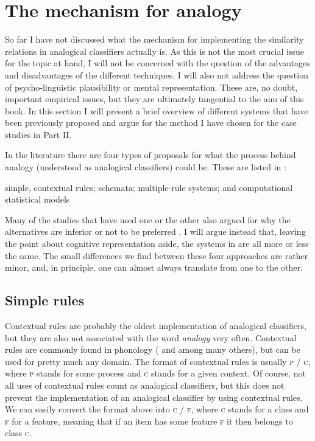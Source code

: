 \section{The mechanism for analogy}\label{sec:mechanisms-analogy}

So far I have not discussed what the mechanism for implementing the similarity relations in analogical classifiers actually is. As this is not the most crucial issue for the topic at hand, I will not be concerned with the question of the advantages and disadvantages of the different techniques. I will also not address the question of psycho-linguistic plausibility or mental representation. These are, no doubt, important empirical issues, but they are ultimately tangential to the aim of this book. In this section I will present a brief overview of different systems that have been previously proposed and argue for the method I have chosen for the case studies in Part II.

In the literature there are four types of proposals for what the process behind analogy (understood as analogical classifiers) could be. These are listed in :

\begin{exe}
    \ex \label{analogy-types}
    \begin{xlist}
        \ex simple, contextual rules;
        \ex schemata;
        \ex multiple-rule systems; and
        \ex computational statistical models%
    \end{xlist}
\end{exe}

Many of the studies that have used one or the other also argued for why the alternatives are inferior or not to be preferred \autocite{Albright.2003, Yaden.2003, Eddington.2000, Gouskova.2015}. I will argue instead that, leaving the point about cognitive representation aside, the systems in  are all more or less the same. The small differences we find between these four approaches are rather minor, and, in principle, one can almost always translate from one to the other.

\subsection{Simple rules}


Contextual rules are probably the oldest implementation of analogical classifiers, but they are also not associated with the word \textit{analogy} very often. Contextual rules are commonly found in phonology (\citealt{Chomsky.1968} and \citealt{Goldsmith.2011} among many others), but can be used for pretty much any domain. The format of contextual rules is usually \textsc{p / c}, where \textsc{p} stands for some process and \textsc{c} stands for a given context. Of course, not all uses of contextual rules count as analogical classifiers, but this does not prevent the implementation of an analogical classifier by using contextual rules. We can easily convert the format above into \textsc{c / f}, where \textsc{c} stands for a class and  \textsc{f} for a feature, meaning that if an item has some feature \textsc{f} it then belongs to class \textsc{c}.

